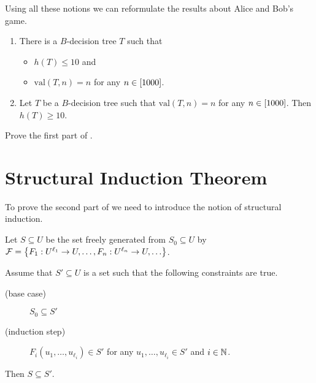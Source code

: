 Using all these notions we can reformulate the results about Alice and Bob's
game.
\begin{theorem}
\label{theorem:guess-the-number}
  \begin{enumerate}
    \item There is a $B$-decision tree $T$ such that
      \begin{itemize}
        \item $h(T) \le 10$ and
        \item $\mathrm{val}(T, n) = n$ for any $n \in {[{1000}]}$.
      \end{itemize}
    \item Let $T$ be a $B$-decision tree such that $\mathrm{val}(T, n) = n$ for
      any $n \in {[{1000}]}$. Then $h(T) \ge 10$.
  \end{enumerate}
\end{theorem}

\begin{exercise}
  Prove the first part of .
\end{exercise}

\section{Structural Induction Theorem}
To prove the second part of  we need
to introduce the notion of structural induction.

\begin{theorem}
\label{theorem:structural-induction}
    Let $S \subseteq U$ be the set freely generated from $S_0 \subseteq U$ by
    $\mathcal{F} =
      \set{F_1 : U^{\ell_1} \to U, \dots, F_n : U^{\ell_n} \to U, \dots }$.

    Assume that $S' \subseteq U$ is a set such that the following constraints
    are true.
    \begin{description}
        \item [(base case)] $S_0 \subseteq S'$
        \item[(induction step)]
          $F_i(u_1, \dots, u_{\ell_i}) \in S'$ for any
          $u_1, \dots, u_{\ell_i} \in S'$ and $i \in {\mathbb{N}}$.
    \end{description}
    Then $S \subseteq S'$.
\end{theorem}

